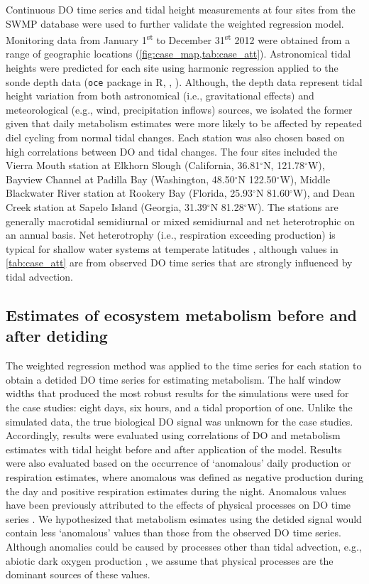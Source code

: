 \documentclass[letterpaper,12pt,oneside]{article}\usepackage[]{graphicx}\usepackage[]{color}
\begin{document}
Continuous \ac{DO} time series and tidal height measurements at four sites from the \ac{SWMP} database  were used to further validate the weighted regression model.  Monitoring data from January 1\textsuperscript{st} to December 31\textsuperscript{st} 2012 were obtained from a range of geographic locations (\cref{fig:case_map,tab:case_att}). Astronomical tidal heights were predicted for each site using harmonic regression applied to the sonde depth data (\texttt{oce} package in R, \citealt{Foreman89}, ). Although, the depth data represent tidal height variation from both astronomical (i.e., gravitational effects) and meteorological (e.g., wind, precipitation inflows) sources, we isolated the former given that daily metabolism estimates were more likely to be affected by repeated diel cycling from normal tidal changes.  Each station was also chosen based on high correlations between \ac{DO} and tidal changes.  The four sites included the Vierra Mouth station at Elkhorn Slough (California, 36.81$^{\circ}$N, 121.78$^{\circ}$W), Bayview Channel at Padilla Bay (Washington, 48.50$^{\circ}$N 122.50$^{\circ}$W), Middle Blackwater River station at Rookery Bay (Florida, 25.93$^{\circ}$N 81.60$^{\circ}$W), and Dean Creek station at Sapelo Island (Georgia, 31.39$^{\circ}$N 81.28$^{\circ}$W).  The stations are generally macrotidal semidiurnal or mixed semidiurnal and net heterotrophic on an annual basis.  Net heterotrophy (i.e., respiration exceeding production) is typical for shallow water systems at temperate latitudes \citep{Caffrey03}, although values in \cref{tab:case_att} are from observed \ac{DO} time series that are strongly influenced by tidal advection.

\subsection{Estimates of ecosystem metabolism before and after detiding}

The weighted regression method was applied to the time series for each station to obtain a detided \ac{DO} time series for estimating metabolism.  The half window widths that produced the most robust results for the simulations were used for the case studies: eight days, six hours, and a tidal proportion of one. Unlike the simulated data, the true biological \ac{DO} signal was unknown for the case studies.  Accordingly, results were evaluated  using correlations of \ac{DO} and metabolism estimates with tidal height before and after application of the model.  Results were also evaluated based on the occurrence of `anomalous' daily production or respiration estimates, where anomalous was defined as negative production during the day and positive respiration estimates during the night.  Anomalous values have been previously attributed to the effects of physical processes on \ac{DO} time series \citep{Caffrey03}.  We hypothesized that metabolism esimates using the detided signal would contain less `anomalous' values than those from the observed \ac{DO} time series.  Although anomalies could be caused by processes other than tidal advection, e.g., abiotic dark oxygen production \citep{Pamatmat97}, we assume that physical processes are the dominant sources of these values.  
\end{document}
